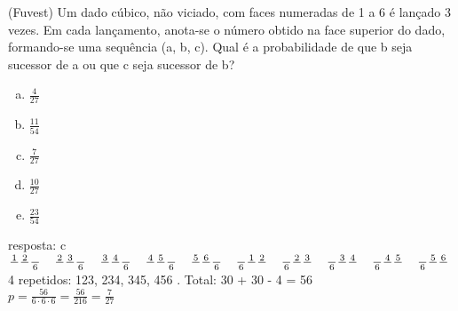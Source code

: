 \begin{ex}
(Fuvest) Um dado cúbico, não viciado, com faces numeradas de 1 a 6 é lançado 3 vezes. Em cada lançamento, anota-se o número obtido na face superior do dado, formando-se uma sequência (a, b, c). Qual é a probabilidade de que b seja sucessor de a ou que c seja sucessor de b?
   \begin{enumerate}[(a)]
   \item $\frac{4}{27}$
   \item $\frac{11}{54}$
   \item $\frac{7}{27}$
   \item $\frac{10}{27}$
   \item $\frac{23}{54}$
   \end{enumerate}
     \begin{sol}
      resposta: c \\
      $\frac{1}{\phantom{A}}\frac{2}{\phantom{A}}\frac{\phantom{A}}{6}\hspace{0,4cm}\frac{2}{\phantom{A}}\frac{3}{\phantom{A}}\frac{\phantom{A}}{6}\hspace{0,4cm}\frac{3}{\phantom{A}}\frac{4}{\phantom{A}}\frac{\phantom{A}}{6}\hspace{0,4cm}\frac{4}{\phantom{A}}\frac{5}{\phantom{A}}\frac{\phantom{A}}{6}\hspace{0,4cm}\frac{5}{\phantom{A}}\frac{6}{\phantom{A}}\frac{\phantom{A}}{6}
      \hspace{0,4cm}\frac{\phantom{A}}{6}\frac{1}{\phantom{A}}\frac{2}{\phantom{A}} \hspace{0,4cm}\frac{\phantom{A}}{6}\frac{2}{\phantom{A}}\frac{3}{\phantom{A}} \hspace{0,4cm}\frac{\phantom{A}}{6}\frac{3}{\phantom{A}}\frac{4}{\phantom{A}} \hspace{0,4cm}\frac{\phantom{A}}{6}\frac{4}{\phantom{A}}\frac{5}{\phantom{A}} \hspace{0,4cm}\frac{\phantom{A}}{6}\frac{5}{\phantom{A}}\frac{6}{\phantom{A}}$\\
      4 repetidos: 123, 234, 345, 456 . Total: 30 + 30 - 4 = 56 \\
      $p=\frac{56}{6\cdot6\cdot6}=\frac{56}{216}=\frac{7}{27}$
     \end{sol}
\end{ex}